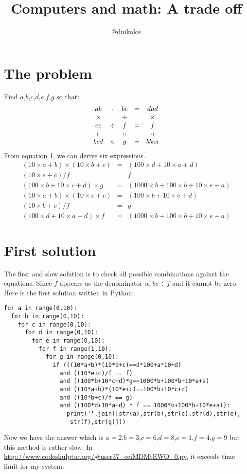 \documentclass{article}
\begin{document}
\title{\vspace{-5em}Computers and math: A trade off}
\author{@dnikolos}
\date{}

\maketitle
\section{The problem}
Find $a$,$b$,$c$,$d$,$e$,$f$,$g$ so that:
\begin{equation}
\begin{array}{ccccc}
ab     &\cdot & bc &=&dad    \\
\times &      &\div& &\times   \\
ec     &\div  & f  &=&f        \\
\shortparallel      & & \shortparallel & & \shortparallel\\
bcd &\times & g &=& bbea
\end{array}
\end{equation}
From equation 1, we can derive six expressions.
\begin{equation}
\begin{array}{rcl}
(10\times a+b)\times (10\times b+c)&=&(100\times d+10\times a+d)\\
(10\times e+c)/f &=& f\\
(100\times b+10\times c+d)\times g&=& (1000\times b+100\times b+10\times e+a)\\
(10\times a+b)\times (10\times e+c)&=& (100\times b+10\times c+d)\\
(10\times b+c)/f &=& g\\
(100\times d+10\times a+d) \times  f &=& (1000\times b+100\times b+10\times e+a)
\end{array}
\end{equation}
\section{First solution}
The first and slow solution is to check all possible combinations against the equations.
Since $f$ appears as the denominator of $bc\div f$ and it cannot be zero.
Here is the first solution written in Python:
\begin{lstlisting}
for a in range(0,10):
  for b in range(0,10):
    for c in range(0,10):
      for d in range(0,10):
        for e in range(0,10):
          for f in range(1,10):
            for g in range(0,10):
              if (((10*a+b)*(10*b+c)==d*100+a*10+d)
                and ((10*e+c)/f == f) 
                and ((100*b+10*c+d)*g==1000*b+100*b+10*e+a)
                and ((10*a+b)*(10*e+c)==100*b+10*c+d)
                and ((10*b+c)/f == g) 
                and ((100*d+10*a+d) * f == 1000*b+100*b+10*e+a)):
                  print(''.join([str(a),str(b),str(c),str(d),str(e),
                   str(f),str(g)]))
\end{lstlisting}
Now we have the answer which is $a=2$,$b=3$,$c=6$,$d=8$,$e=1$,$f=4$,$g=9$ but this method is rather slow. In \url{http://www.codeskulptor.org/#user37_ceiMDMtEWQ_0.py}, it exceeds time limit for my system.
\end{document}
